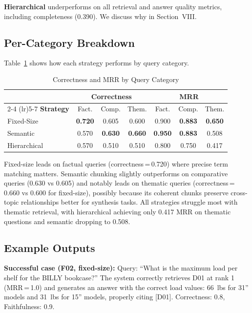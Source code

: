 \documentclass[conference]{IEEEtran}
\begin{document}
\textbf{Hierarchical} underperforms on all retrieval and answer quality metrics, including completeness (0.390). We discuss why in Section~VIII.

\subsection{Per-Category Breakdown}

Table~\ref{tab:category} shows how each strategy performs by query category.

\begin{table}[htbp]
\caption{Correctness and MRR by Query Category}
\begin{center}
\begin{tabular}{lcccccc}
\toprule
& \multicolumn{3}{c}{\textbf{Correctness}} & \multicolumn{3}{c}{\textbf{MRR}} \\
\cmidrule(lr){2-4} \cmidrule(lr){5-7}
\textbf{Strategy} & Fact. & Comp. & Them. & Fact. & Comp. & Them. \\
\midrule
Fixed-Size & \textbf{0.720} & 0.605 & 0.600 & 0.900 & \textbf{0.883} & \textbf{0.650} \\
Semantic & 0.570 & \textbf{0.630} & \textbf{0.660} & \textbf{0.950} & \textbf{0.883} & 0.508 \\
Hierarchical & 0.570 & 0.510 & 0.510 & 0.800 & 0.750 & 0.417 \\
\bottomrule
\end{tabular}
\label{tab:category}
\end{center}
\end{table}

Fixed-size leads on factual queries (correctness\,=\,0.720) where precise term matching matters. Semantic chunking slightly outperforms on comparative queries (0.630 vs 0.605) and notably leads on thematic queries (correctness\,=\,0.660 vs 0.600 for fixed-size), possibly because its coherent chunks preserve cross-topic relationships better for synthesis tasks. All strategies struggle most with thematic retrieval, with hierarchical achieving only 0.417 MRR on thematic questions and semantic dropping to 0.508.

\subsection{Example Outputs}

\textbf{Successful case (F02, fixed-size):} Query: ``What is the maximum load per shelf for the BILLY bookcase?'' The system correctly retrieves D01 at rank 1 (MRR\,=\,1.0) and generates an answer with the correct load values: 66~lbs for 31\textonehalf{}'' models and 31~lbs for 15\textthreequarters{}'' models, properly citing [D01]. Correctness: 0.8, Faithfulness: 0.9.
\end{document}
